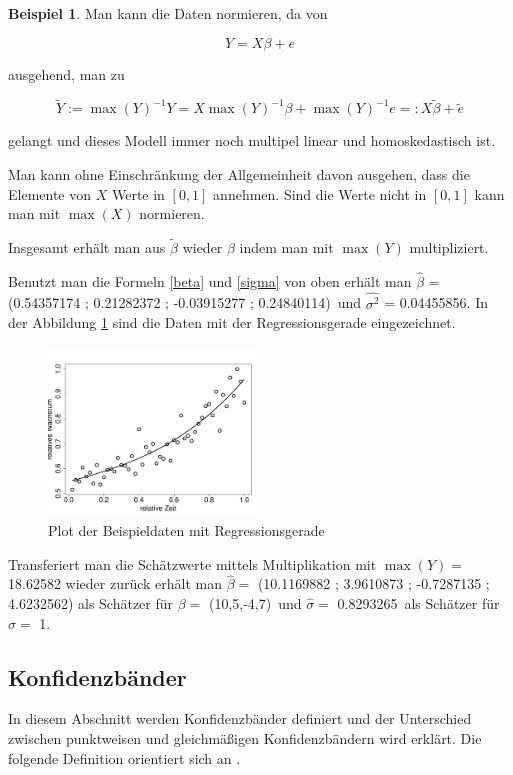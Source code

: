\documentclass[12pt,a4paper]{article}
\theoremstyle{definition}
\newtheorem{Beispiel}[Definition]{Beispiel}
\theoremstyle{definition}
\theoremstyle{definition}
\theoremstyle{definition}
\newcommand{\betatrue}{(10,5,-4,7)}
\newcommand{\sigmatrue}{1}
\newcommand{\betaoneest}{(0.54357174 ; 0.21282372 ; -0.03915277 ; 0.24840114)}
\newcommand{\sigmaoneest}{0.04455856}
\newcommand{\maxY}{ 18.62582 }
\newcommand{\betaesttrafo}{ (10.1169882 ; 3.9610873 ; -0.7287135 ; 4.6232562) }
\newcommand{\sigmaesttrafo}{0.8293265}
\begin{document}
\begin{Beispiel}
Man kann die Daten normieren, da von 

\begin{equation*}
Y=X\beta+e
\end{equation*}

ausgehend, man zu 

\begin{equation*}
\tilde{Y} := \max(Y)^{-1} Y = X \max(Y)^{-1} \beta + \max(Y)^{-1} e =: X \tilde{\beta} + \tilde{e}
\end{equation*}

gelangt und dieses Modell immer noch multipel linear und homoskedastisch ist. 

Man kann ohne Einschränkung der Allgemeinheit davon ausgehen, dass die Elemente von $X$ Werte in $[0,1]$ annehmen. Sind die Werte nicht in $[0,1]$ kann man mit $\max(X)$ normieren.

Insgesamt erhält man aus $\tilde{\beta}$ wieder $\beta$ indem man mit $\max(Y)$ multipliziert.  

Benutzt man die Formeln \eqref{beta} und \eqref{sigma} von oben erhält man  $\hat{\beta}$ = \betaoneest ~und $\widehat{\sigma^2}$ = \sigmaoneest. In der Abbildung \ref{Beispieldaten_Regressionsgerade} sind die Daten mit der Regressionsgerade eingezeichnet.

\begin{figure}[H] 
  \centering
     \includegraphics[width=0.5\textwidth]{regression-gerade}
  \caption{Plot der Beispieldaten mit Regressionsgerade}
  \label{Beispieldaten_Regressionsgerade}
\end{figure}
 
\end{Beispiel} 

Transferiert man die Schätzwerte mittels Multiplikation mit $\max(Y) = $ \maxY wieder zurück erhält man $\hat{\beta} =$ \betaesttrafo als Schätzer für $\beta =$ \betatrue ~und $\hat{\sigma} = $ \sigmaesttrafo ~als Schätzer für $\sigma = $ \sigmatrue .


\subsection{Konfidenzbänder}
\label{Konfidenzbaender}
In diesem Abschnitt werden Konfidenzbänder definiert und der Unterschied zwischen punktweisen und gleichmäßigen Konfidenzbändern wird erklärt. Die folgende Definition orientiert sich an \cite[229]{Georgii09}.
\end{document}

